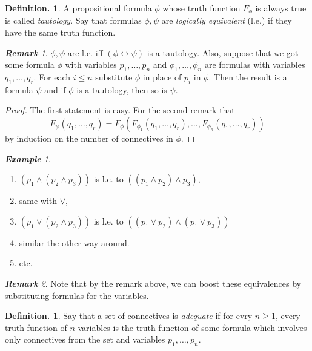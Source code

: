 \documentclass[a4paper,oneside,11pt,DIV=12,parskip=half]{scrartcl}
\theoremstyle{plain}
\theoremstyle{definition}
\newtheorem{definition}[theorem]{Definition.}
\newtheorem{remark, definition}[theorem]{Remark and Definition.}
\newtheorem{lemma, definition}[theorem]{Lemma and Definition.}
\newtheorem{theorem, definition}[theorem]{Theorem and Definition.}
\theoremstyle{remark}
\newtheorem*{remark}{\textbf{Remark}}
\newtheorem*{example}{\textbf{Example}}
\newtheorem*{remark, example}{\textbf{Remark and Exercise}}
\begin{document}
\begin{definition}
A propositional formula $\phi$ whose truth function $F_{\phi}$ is always true is called \emph{tautology}.
Say that formulas $\phi, \psi$ are \emph{logically equivalent} (l.e.) if they have the same truth function.
\end{definition}

\begin{remark}
$\phi,\psi$ are l.e. iff $(\phi \leftrightarrow \psi)$ is a tautology.
Also, suppose that we got some formula $\phi$ with variables $p_1, \dots, p_n$ and $\phi_1,\dots,\phi_n$ are formulas with variables $q_1, \dots, q_r$.
For each $i \leq n$ substitute $\phi$ in place of $p_i$ in $\phi$. Then the result is a formula $ \psi$ and if $\phi$ is a tautology, then so is $\psi$.
\end{remark}

\begin{proof}
The first statement is easy. For the second remark that
	\[ F_{\psi}(q_1, \dots, q_r) = F_{\phi}(F_{\phi_1}(q_1, \dots, q_r), \dots, F_{\phi_n}(q_1, \dots, q_r)) \]
by induction on the number of connectives in $\phi$.
\end{proof}

\begin{example}
\begin{enumerate}
\item $(p_1 \land ( p_2 \land p_3))$ is l.e. to $((p_1 \land p_2) \land p_3)$,
\item same with $ \lor $,
\item $(p_1 \lor (p_2 \land p_3))$ is l.e. to $((p_1 \lor p_2) \land (p_1 \lor p_3))$ 
\item similar the other way around.
\item etc.

\end{enumerate}
\end{example}

\begin{remark}
Note that by the remark above, we can boost these equivalences by substituting formulas for the variables.
\end{remark}

\begin{definition}

Say that a set of connectives is \emph{adequate} if for evry $n \geq 1$, every truth function of $n$ variables is the truth function of some formula which involves only connectives from the set and variables $p_1, \dots, p_n$.
\end{definition}
\end{document}
